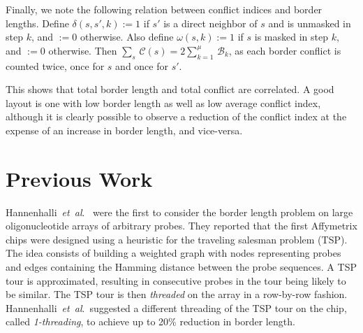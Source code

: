 \documentclass{llncs}
\newcommand{\ignore}[1]{}
\begin{document}
Finally, we note the following relation between conflict indices and border
lengths. Define $\delta(s,s',k):=1$ if $s'$ is a direct neighbor of $s$ and is
unmasked in step $k$, and $:=0$ otherwise.  Also define $\omega(s,k):=1$ if
$s$ is masked in step $k$, and $:=0$ otherwise. Then $\sum_s\, \mathcal{C}(s)
= 2 \sum_{k=1}^\mu\, \mathcal{B}_k$, as each border conflict is counted twice,
once for $s$ and once for $s'$.

This shows that total border length and total conflict are correlated. A good
layout is one with low border length as well as low average conflict index,
although it is clearly possible to observe a reduction of the conflict index
at the expense of an increase in border length, and vice-versa.


\section{Previous Work}
\label{sec:previous_work}

\ignore{The first to formally address the border length problem were \cite{FELDMAN93}.
They showed how an optimal placement can be constructed based on a two-dimensional
Gray code. However, their work is restricted to \emph{uniform arrays} (arrays
containing all possible probes of a given length) and synchronous embeddings.}

Hannenhalli~{\it et~al}.\ \cite{HANNENHALLI02} were the first to consider the border
length problem on large
oligonucleotide arrays of arbitrary probes. They reported that the first Affymetrix
chips were designed using a heuristic for the traveling salesman problem (TSP). The
idea consists of building a weighted graph with nodes representing probes and edges
containing the Hamming distance between the probe sequences. A TSP tour is approximated,
resulting in consecutive probes in the tour being likely to be similar. The TSP
tour is then \emph{threaded} on the array in a row-by-row fashion.
Hannenhalli~{\it et~al}.\ suggested a different threading of the TSP tour on the chip,
called \emph{1-threading}, to achieve up to 20\% reduction in border length.
\end{document}
